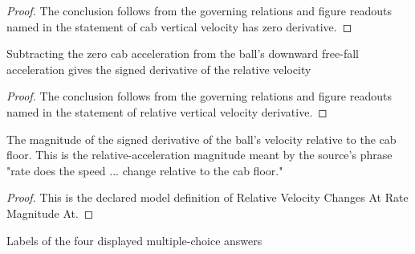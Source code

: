 \begin{proof}
  The conclusion follows from the governing relations and figure readouts named in the statement of cab vertical velocity has zero derivative.
\end{proof}
\begin{lemma}
  \label{lem:physics:phyx-mini-0754:phyxminiproblems-problemphyxmini0754-relative-vertical-velocity-derivative}
  Subtracting the zero cab acceleration from the ball's downward free-fall acceleration gives the signed derivative of the relative velocity
\end{lemma}
\begin{proof}
  The conclusion follows from the governing relations and figure readouts named in the statement of relative vertical velocity derivative.
\end{proof}
\begin{definition}
  \label{def:physics:phyx-mini-0754:phyxminiproblems-problemphyxmini0754-relativevelocitychangesatratemagnitudeat}
  The magnitude of the signed derivative of the ball's velocity relative to the cab floor. This is the relative-acceleration magnitude meant by the source's phrase "rate does the speed ... change relative to the cab floor."
\end{definition}
\begin{proof}
  This is the declared model definition of Relative Velocity Changes At Rate Magnitude At.
\end{proof}
\begin{definition}
  \label{def:physics:phyx-mini-0754:phyxminiproblems-problemphyxmini0754-answerchoice}
  Labels of the four displayed multiple-choice answers
\end{definition}
